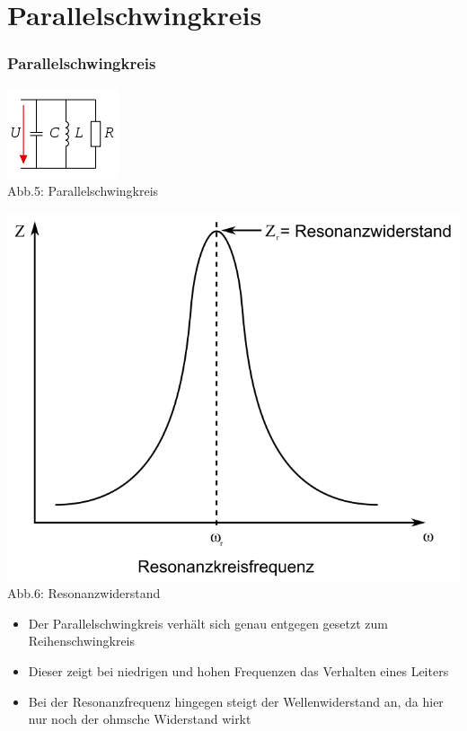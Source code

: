 \section*{Parallelschwingkreis}
\begin{frame}
\frametitle{Parallelschwingkreis}
\begin{center}
	\begin{minipage}{0.4\textwidth}
	\includegraphics[scale=1]{e07/Parallelschw.png}\\
	\tiny{Abb.5: Parallelschwingkreis \cite{wmen}}
	\end{minipage}
	\begin{minipage}{0.4\textwidth}
	\includegraphics[scale=0.2]{e07/ParallelschwSig.png}\\
	\tiny{Abb.6: Resonanzwiderstand \cite{wmen}} 
	\end{minipage}
\end{center}
\begin{itemize}
	\item Der Parallelschwingkreis verhält sich genau entgegen gesetzt zum Reihenschwingkreis
	\item Dieser zeigt bei niedrigen und hohen Frequenzen das Verhalten eines Leiters
	\item Bei der Resonanzfrequenz hingegen steigt der Wellenwiderstand an, da hier nur noch der ohmsche Widerstand wirkt
\end{itemize}
\end{frame}

